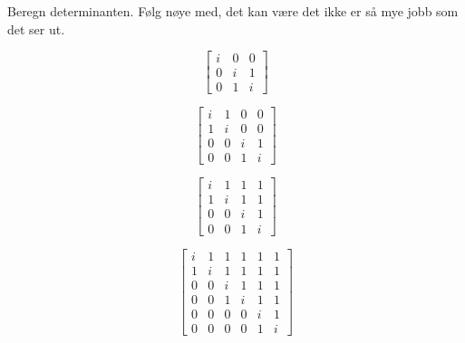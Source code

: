 \begin{oppgave}
Beregn determinanten. Følg nøye med,  det kan være det ikke er så mye jobb som det ser ut.
\begin{punkt}
\[
\begin{bmatrix}
 i & 0 & 0 \\  0 & i & 1 \\  0& 1  &i  
\end{bmatrix}
\]
\end{punkt}
\begin{punkt}
\[
\begin{bmatrix}
i & 1 & 0 & 0 \\ 1 & i & 0 & 0 \\ 0 & 0 & i & 1 \\ 0 & 0& 1  &i  
\end{bmatrix}
\]
\end{punkt}

\begin{punkt}
\[
\begin{bmatrix}
i & 1 & 1 & 1  \\ 1 & i & 1 & 1 \\ 0 & 0 & i & 1 \\ 0 & 0& 1  &i 
\end{bmatrix}
\]
\end{punkt}

\begin{punkt}
\[
\begin{bmatrix}
i & 1 & 1 & 1 & 1 & 1 \\ 1 & i & 1 & 1 & 1 & 1\\ 0 & 0 & i & 1& 1 & 1 \\ 0 & 0& 1  &i & 1 & 1 \\ 0 & 0 & 0 & 0 & i & 1\\ 0 & 0 & 0 & 0 & 1 & i 
\end{bmatrix}
\]
\end{punkt}


\end{oppgave}
